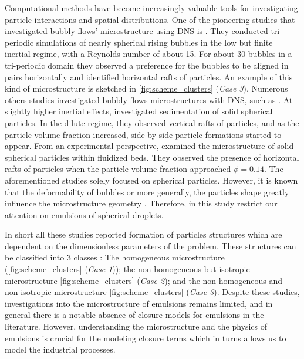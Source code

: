 Computational methods have become increasingly valuable tools for investigating particle interactions and spatial distributions. 
One of the pioneering studies that investigated bubbly flows' microstructure using DNS is \citet{bunner2002dynamics}. 
They conducted tri-periodic simulations of nearly spherical rising bubbles in the low but finite inertial regime, with a Reynolds number of about 15. 
For about $30$ bubbles in a tri-periodic domain they observed a preference for the bubbles to be aligned in pairs horizontally and identified horizontal rafts of particles. 
An example of this kind of microstructure is sketched in \ref{fig:scheme_clusters} (\textit{Case 3}).
Numerous others studies investigated bubbly flows microstructures with DNS, such as \citet{yin2008lattice,roghair2011drag,zhang2023evolution}.
At slightly higher inertial effects, \citet{shajahan2023inertial} investigated sedimentation of solid spherical particles. 
In the dilute regime, they observed vertical rafts of particles, and as the particle volume fraction increased, side-by-side particle formations started to appear. 
From an experimental perspective, \citet{almeras2021statistics} examined the microstructure of solid spherical particles within fluidized beds.
They observed the presence of horizontal rafts of particles when the particle volume fraction approached $\phi = 0.14$.
The aforementioned studies solely focused on spherical particles.
However, it is known that the deformability of bubbles or more generally, the particles shape  greatly influence the microstructure geometry \citet{bunner2003effect,seyed2021sedimentation}. 
Therefore, in this study restrict our attention on emulsions of spherical droplets. 

In short all these studies reported formation of particles structures which are dependent on the dimensionless parameters of the problem. 
These structures can be classified into $3$ classes : The homogeneous microstructure (\ref{fig:scheme_clusters} (\textit{Case 1})); the non-homogeneous but isotropic microstructure \ref{fig:scheme_clusters} (\textit{Case 2}); and the non-homogeneous and non-isotropic microstructure \ref{fig:scheme_clusters} (\textit{Case 3}). 
Despite these studies, investigations into the microstructure of emulsions remains limited, and in general there is a notable absence of closure models for emulsions in the literature.  
However, understanding the microstructure and the physics of emulsions is crucial for the modeling closure terms which in turns allows us to model the industrial processes. 


